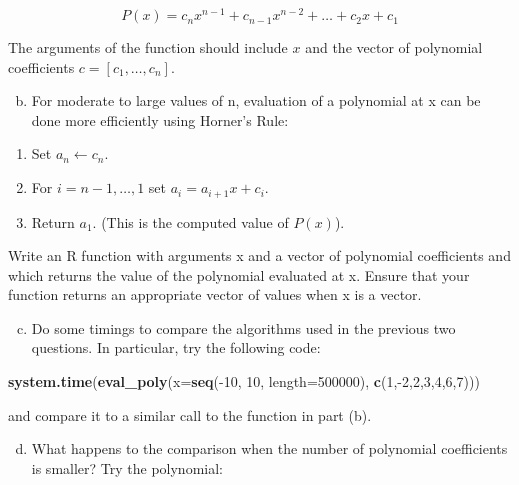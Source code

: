 \documentclass[]{article}
\newenvironment{Shaded}{}{}
\newcommand{\KeywordTok}[1]{\textcolor[rgb]{0.00,0.44,0.13}{\textbf{{#1}}}}
\newcommand{\DataTypeTok}[1]{\textcolor[rgb]{0.56,0.13,0.00}{{#1}}}
\newcommand{\DecValTok}[1]{\textcolor[rgb]{0.25,0.63,0.44}{{#1}}}
\newcommand{\NormalTok}[1]{{#1}}
\begin{document}
\[P(x) = c_n x^{n-1} + c_{n-1} x^{n-2} + \ldots + c_2 x + c_1\]

The arguments of the function should include $x$ and the vector of
polynomial coefficients $c = [c_1, \ldots, c_n]$.

\begin{enumerate}[a.]
\setcounter{enumi}{1}
\item
  For moderate to large values of n, evaluation of a polynomial at x can
  be done more efficiently using Horner's Rule:
\end{enumerate}

\begin{enumerate}[1.]
\item
  Set $a_n \leftarrow c_n$.
\item
  For $i=n-1,\ldots,1$ set $a_i = a_{i+1} x+c_i$.
\item
  Return $a_1$. (This is the computed value of $P(x)$).
\end{enumerate}

Write an R function with arguments x and a vector of polynomial
coefficients and which returns the value of the polynomial evaluated at
x. Ensure that your function returns an appropriate vector of values
when x is a vector.

\begin{enumerate}[a.]
\setcounter{enumi}{2}
\item
  Do some timings to compare the algorithms used in the previous two
  questions. In particular, try the following code:
\end{enumerate}

\begin{Shaded}
\begin{Highlighting}[]
\KeywordTok{system.time}\NormalTok{(}\KeywordTok{eval_poly}\NormalTok{(}\DataTypeTok{x=}\KeywordTok{seq}\NormalTok{(-}\DecValTok{10}\NormalTok{, }\DecValTok{10}\NormalTok{, }\DataTypeTok{length=}\DecValTok{500000}\NormalTok{), }\KeywordTok{c}\NormalTok{(}\DecValTok{1}\NormalTok{,-}\DecValTok{2}\NormalTok{,}\DecValTok{2}\NormalTok{,}\DecValTok{3}\NormalTok{,}\DecValTok{4}\NormalTok{,}\DecValTok{6}\NormalTok{,}\DecValTok{7}\NormalTok{)))}
\end{Highlighting}
\end{Shaded}

and compare it to a similar call to the function in part (b).

\begin{enumerate}[a.]
\setcounter{enumi}{3}
\item
  What happens to the comparison when the number of polynomial
  coefficients is smaller? Try the polynomial:
\end{enumerate}
\end{document}
